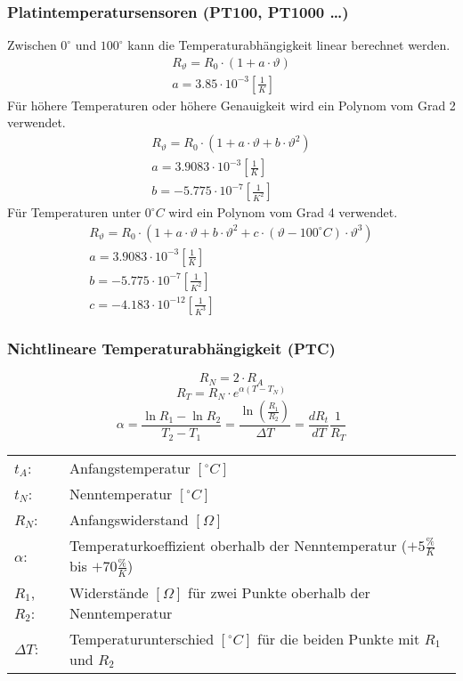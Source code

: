\subsubsection{Platintemperatursensoren (PT100, PT1000 \dots)}
Zwischen $0^\circ$ und $100^\circ$ kann die Temperaturabhängigkeit linear 
berechnet werden. 
\[ \begin{array}{l}
R_\vartheta = R_0 \cdot (1 + a \cdot \vartheta) \\
a = 3.85 \cdot 10^{-3} \left[\frac{1}{K}\right] 
\end{array} \]
%
Für höhere Temperaturen oder höhere Genauigkeit wird ein Polynom vom Grad 2 
verwendet. 
\[ \begin{array}{l}
R_\vartheta = R_0 \cdot (1 + a \cdot \vartheta + b \cdot \vartheta^2) \\
a = 3.9083 \cdot 10^{-3} \left[\frac{1}{K}\right] \\
b = -5.775 \cdot 10^{-7} \left[\frac{1}{K^2}\right] 
\end{array} \]
%
Für Temperaturen unter $0^\circ C$ wird ein Polynom vom Grad 4 verwendet. 
\[ \begin{array}{l}
R_\vartheta = R_0 \cdot (1 + a \cdot \vartheta + b \cdot \vartheta^2 
+ c \cdot (\vartheta - 100^\circ C) \cdot \vartheta^3) \\
a = 3.9083 \cdot 10^{-3} \left[\frac{1}{K}\right] \\
b = -5.775 \cdot 10^{-7} \left[\frac{1}{K^2}\right] \\
c = -4.183 \cdot 10^{-12} \left[\frac{1}{K^3}\right] 
\end{array} \]


\subsubsection{Nichtlineare Temperaturabhängigkeit (PTC)}
\[ R_N = 2 \cdot R_A \]
\[ R_T = R_N \cdot e^{\alpha (T - T_N)} \]
\[ \alpha = \frac{\ln R_1 - \ln R_2}{T_2 - T_1} 
= \frac{\ln\left(\frac{R_1}{R_2}\right)}{\Delta T} 
= \frac{d R_t}{d T}\frac{1}{R_T} \]
\begin{tabular}{@{}lp{}}
  $t_A$:        & Anfangstemperatur $[^\circ C]$ \\
  $t_N$:        & Nenntemperatur $[^\circ C]$ \\
  $R_N$:        & Anfangswiderstand $[\Omega]$ \\
  $\alpha$:     & Temperaturkoeffizient oberhalb der Nenntemperatur 
                  ($+5\frac{\%}{K}$ bis $+70\frac{\%}{K}$) \\
  $R_1$, $R_2$: & Widerstände $[\Omega]$ für zwei Punkte oberhalb der 
                  Nenntemperatur \\
  $\Delta T$:   & Temperaturunterschied $[^\circ C]$ für die beiden Punkte mit 
                  $R_1$ und $R_2$
\end{tabular}

